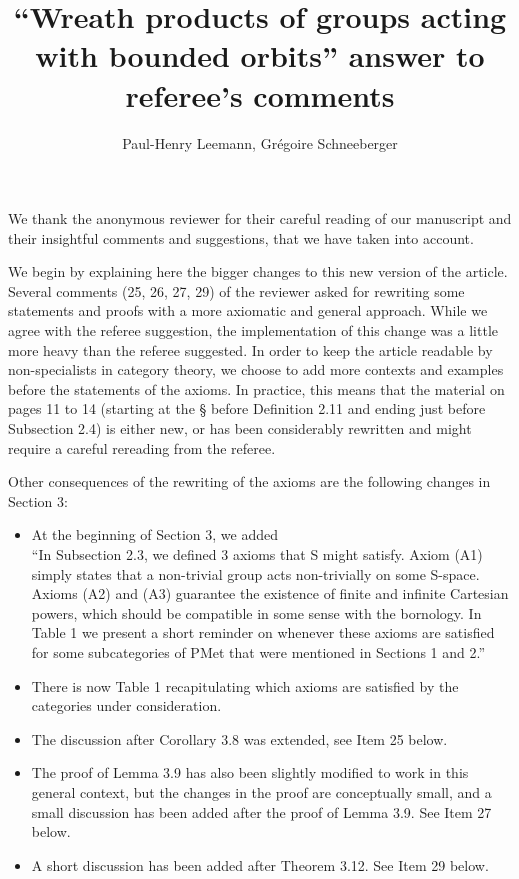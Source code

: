 \documentclass[english,a4paper]{article}
\title{``Wreath products of groups acting with bounded orbits'' answer to referee's comments}
\author{Paul-Henry Leemann, Grégoire Schneeberger}
\begin{document}
\maketitle
%
%
%
%
%
%
%
%
%
%
We thank the anonymous reviewer for their careful reading of our manuscript and their insightful comments and suggestions, that we have taken into account.

We begin by explaining here the bigger changes to this new version of the article.
Several comments (25, 26, 27, 29) of the reviewer asked for rewriting some statements and proofs with a more axiomatic and general approach. While we agree with the referee suggestion, the implementation of this change was a little more heavy than the referee suggested. In order to keep the article readable by non-specialists in category theory, we choose to add more contexts and examples before the statements of the axioms.
In practice, this means that the material on pages 11 to 14 (starting at the § before Definition 2.11 and ending just before Subsection 2.4) is either new, or has been considerably rewritten and might require a careful rereading from the referee.

Other consequences of the rewriting of the axioms are the following changes in Section 3:
\begin{itemize}
\item At the beginning of Section 3, we added\\
``In Subsection 2.3, we defined 3 axioms that S might satisfy. Axiom (A1) simply states that a non-trivial group acts non-trivially on some S-space. Axioms (A2) and (A3) guarantee the existence of finite and infinite Cartesian powers, which should be compatible in some sense with the bornology. In Table 1 we present a short reminder on whenever these axioms are satisfied for some subcategories of PMet that were mentioned in Sections 1 and 2.''
\item There is now Table 1 recapitulating which axioms are satisfied by the categories under consideration.
\item The discussion after Corollary 3.8 was extended, see Item 25 below.
\item The proof of Lemma 3.9 has also been slightly modified to work in this general context, but the changes in the proof are conceptually small, and a small discussion has been added after the proof of Lemma 3.9.
See Item 27 below.
\item A short discussion has been added after Theorem 3.12. See Item 29 below.
\end{itemize}
\end{document}
